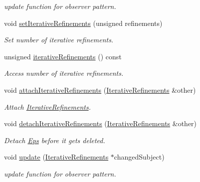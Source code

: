 \begin{DoxyCompactItemize}
\begin{DoxyCompactList}\small\item\em update function for observer pattern. \end{DoxyCompactList}\item 
void \hyperlink{classSpacy_1_1Mixin_1_1IterativeRefinements_afd8815d6932a99b1700f54162d9f633e_afd8815d6932a99b1700f54162d9f633e}{set\+Iterative\+Refinements} (unsigned refinements)
\begin{DoxyCompactList}\small\item\em Set number of iterative refinements. \end{DoxyCompactList}\item 
unsigned \hyperlink{classSpacy_1_1Mixin_1_1IterativeRefinements_a560cd9428928c941765b71dd7c51ae3b_a560cd9428928c941765b71dd7c51ae3b}{iterative\+Refinements} () const 
\begin{DoxyCompactList}\small\item\em Access number of iterative refinements. \end{DoxyCompactList}\item 
void \hyperlink{classSpacy_1_1Mixin_1_1IterativeRefinements_ad2d1f161aa254d7511df897556e7613e_ad2d1f161aa254d7511df897556e7613e}{attach\+Iterative\+Refinements} (\hyperlink{classSpacy_1_1Mixin_1_1IterativeRefinements_a0cdc2228af8fe052680d24fc4bb7ed6a_a0cdc2228af8fe052680d24fc4bb7ed6a}{Iterative\+Refinements} \&other)
\begin{DoxyCompactList}\small\item\em Attach \hyperlink{classSpacy_1_1Mixin_1_1IterativeRefinements}{Iterative\+Refinements}. \end{DoxyCompactList}\item 
\hypertarget{classSpacy_1_1Mixin_1_1IterativeRefinements_aa3b4275d845ef9dabb3f5fefbed43112}{}void \hyperlink{classSpacy_1_1Mixin_1_1IterativeRefinements_aa3b4275d845ef9dabb3f5fefbed43112}{detach\+Iterative\+Refinements} (\hyperlink{classSpacy_1_1Mixin_1_1IterativeRefinements_a0cdc2228af8fe052680d24fc4bb7ed6a_a0cdc2228af8fe052680d24fc4bb7ed6a}{Iterative\+Refinements} \&other)\label{classSpacy_1_1Mixin_1_1IterativeRefinements_aa3b4275d845ef9dabb3f5fefbed43112}

\begin{DoxyCompactList}\small\item\em Detach \hyperlink{classSpacy_1_1Mixin_1_1Eps}{Eps} before it gets deleted. \end{DoxyCompactList}\item 
\hypertarget{classSpacy_1_1Mixin_1_1IterativeRefinements_adcb6062728331e48515a05f539628062}{}void \hyperlink{classSpacy_1_1Mixin_1_1IterativeRefinements_adcb6062728331e48515a05f539628062}{update} (\hyperlink{classSpacy_1_1Mixin_1_1IterativeRefinements_a0cdc2228af8fe052680d24fc4bb7ed6a_a0cdc2228af8fe052680d24fc4bb7ed6a}{Iterative\+Refinements} $\ast$changed\+Subject)\label{classSpacy_1_1Mixin_1_1IterativeRefinements_adcb6062728331e48515a05f539628062}

\begin{DoxyCompactList}\small\item\em update function for observer pattern. \end{DoxyCompactList}\end{DoxyCompactItemize}
